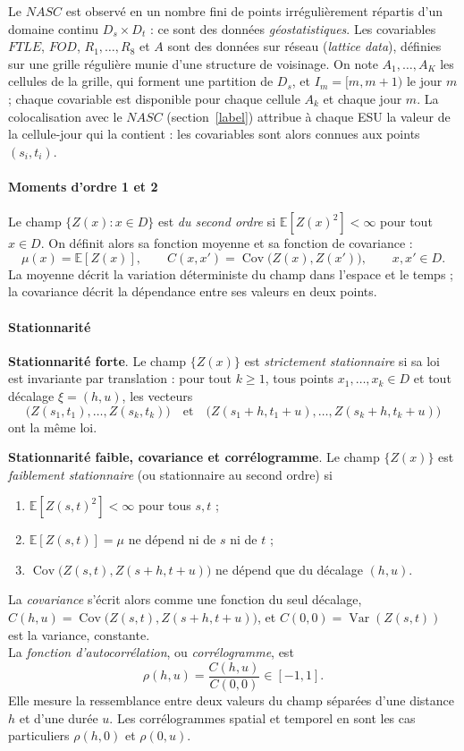 	Le $NASC$ est observé en un nombre fini de points irrégulièrement répartis d'un domaine continu $D_s \times D_t$ : ce sont des données \textit{géostatistiques}. Les covariables $FTLE$, $FOD$, $R_1, \ldots, R_8$ et $A$ sont des données sur réseau (\textit{lattice data}), définies sur une grille régulière munie d'une structure de voisinage. On note $A_1, \dots, A_K$ les cellules de la grille, qui forment une partition de $D_s$, et $I_m = [m, m+1)$ le jour $m$ ; chaque covariable est disponible pour chaque cellule $A_k$ et chaque jour $m$. La colocalisation avec le $NASC$ (section~\ref{label}) attribue à chaque ESU la valeur de la cellule-jour qui la contient : les covariables sont alors connues aux points $(s_i, t_i)$.
	
	\paragraph{Moments d'ordre 1 et 2}
	Le champ $\{Z(x) : x \in D\}$ est \textit{du second ordre} si $\mathbb{E}[Z(x)^2] < \infty$ pour tout $x \in D$. On définit alors sa fonction moyenne et sa fonction de covariance :
	\[
	\mu(x) = \mathbb{E}[Z(x)],
	\qquad
	C(x, x') = \operatorname{Cov}\bigl(Z(x), Z(x')\bigr), \qquad x, x' \in D.
	\]
	La moyenne décrit la variation déterministe du champ dans l'espace et le temps ; la covariance décrit la dépendance entre ses valeurs en deux points.
	
	\paragraph{Stationnarité}
	\textbf{Stationnarité forte}. Le champ $\{Z(x)\}$ est \textit{strictement stationnaire} si sa loi est invariante par translation : pour tout $k \ge 1$, tous points $x_1, \dots, x_k \in D$ et tout décalage $\xi = (h,u)$, les vecteurs
	\[
	\bigl(Z(s_1, t_1), \dots, Z(s_k, t_k)\bigr)
	\quad\text{et}\quad
	\bigl(Z(s_1 + h, t_1 + u), \dots, Z(s_k + h, t_k + u)\bigr)
	\]
	ont la même loi.
	
	\textbf{Stationnarité faible, covariance et corrélogramme}.
	Le champ $\{Z(x)\}$ est \textit{faiblement stationnaire} (ou stationnaire au second ordre) si
	\begin{enumerate}[label=(\roman*),nosep]
		\item $\mathbb{E}[Z(s,t)^2] < \infty$ pour tous $s, t$ ;
		\item $\mathbb{E}[Z(s,t)] = \mu$ ne dépend ni de $s$ ni de $t$ ;
		\item $\operatorname{Cov}\bigl(Z(s,t), Z(s+h, t+u)\bigr)$ ne dépend que du décalage $(h,u)$.
	\end{enumerate}
	La \textit{covariance} s'écrit alors comme une fonction du seul décalage, $C(h,u) = \operatorname{Cov}\bigl(Z(s,t), Z(s+h,t+u)\bigr)$, et $C(0,0) = \operatorname{Var}(Z(s,t))$ est la variance, constante.\\
	La \textit{fonction d'autocorrélation}, ou \textit{corrélogramme}, est
	\[
	\rho(h,u) = \frac{C(h,u)}{C(0,0)} \in [-1, 1].
	\]
	Elle mesure la ressemblance entre deux valeurs du champ séparées d'une distance $h$ et d'une durée $u$. Les corrélogrammes spatial et temporel en sont les cas particuliers $\rho(h, 0)$ et $\rho(0, u)$. 
	
